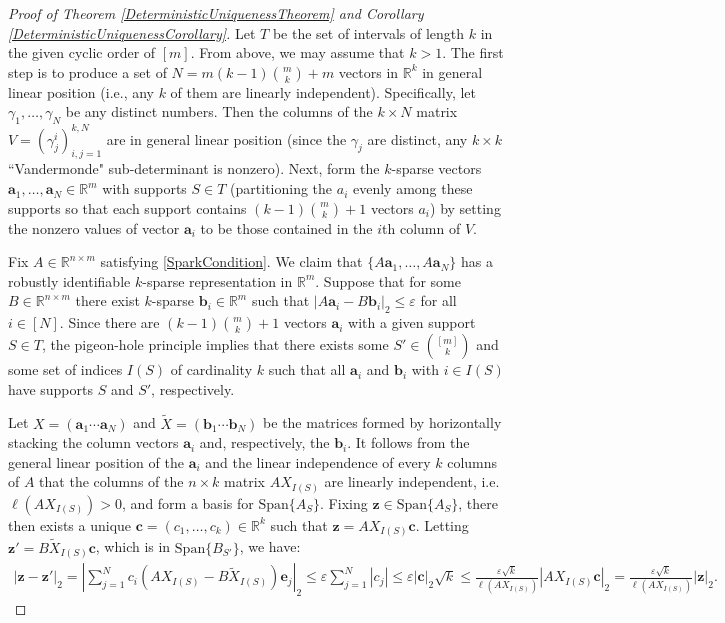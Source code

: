 \documentclass[journal, onecolumn]{IEEEtran}
\begin{document}
\begin{proof}[Proof of Theorem \ref{DeterministicUniquenessTheorem} and Corollary \ref{DeterministicUniquenessCorollary}]
Let $T$ be the set of intervals of length $k$ in the given cyclic order of $[m]$.  From above, we may assume that $k > 1$. The first step is to produce a set of $N = m(k-1){m \choose k}+m$ vectors in $\mathbb{R}^k$ in general linear position (i.e., any $k$ of them are linearly independent). Specifically, let $\gamma_1, \ldots, \gamma_N$ be any distinct numbers. Then the columns of the $k \times N$ matrix $V = (\gamma^i_j)^{k,N}_{i,j=1}$ are in general linear position (since the $\gamma_j$ are distinct, any $k \times k$ ``Vandermonde" sub-determinant is nonzero). Next, form the $k$-sparse vectors $\mathbf{a}_1, \ldots, \mathbf{a}_N \in \mathbb{R}^m$ with supports $S \in T$ (partitioning the $a_i$ evenly among these supports so that each support contains $(k-1){m \choose k}+1$ vectors $a_i$) by setting the nonzero values of vector $\mathbf{a}_i$ to be those contained in the $i$th column of $V$.

Fix $A \in \mathbb{R}^{n \times m}$ satisfying \eqref{SparkCondition}. We claim that $\{A\mathbf{a}_1, \ldots, A\mathbf{a}_N\}$ has a robustly identifiable $k$-sparse representation in $\mathbb{R}^m$. Suppose that for some $B \in \mathbb{R}^{n \times m}$ there exist $k$-sparse $\mathbf{b}_i \in \mathbb{R}^m$ such that $|A\mathbf{a}_i - B\mathbf{b}_i|_2 \leq \varepsilon$ for all $i \in [N]$. Since there are $(k-1){m \choose k}+1$ vectors $\mathbf{a}_i$ with a given support $S \in T$, the pigeon-hole principle implies that there exists some $S' \in {[m] \choose k}$ and some set of indices $I(S)$ of cardinality $k$ such that all $\mathbf{a}_i$ and $\mathbf{b}_i$ with $i \in I(S)$ have supports $S$ and $S'$, respectively.

Let $X = (\mathbf{a}_1 \cdots \mathbf{a}_N)$ and $\tilde{X} = (\mathbf{b}_1 \cdots \mathbf{b}_N)$ be the matrices formed by horizontally stacking the column vectors $\mathbf{a}_i$ and, respectively, the $\mathbf{b}_i$. It follows from the general linear position of the $\mathbf{a}_i$ and the linear independence of every $k$ columns of $A$ that the columns of the $n \times k$ matrix $AX_{I(S)}$ are linearly independent, i.e. $\ell(AX_{I(S)}) > 0$, and form a basis for $\text{Span}\{A_{S}\}$. Fixing $\mathbf{z} \in \text{Span}\{A_{S}\}$, there then exists a unique $\mathbf{c} = (c_1, \ldots, c_k) \in \mathbb{R}^k$ such that $\mathbf{z} = AX_{I(S)}\mathbf{c}$. Letting $\mathbf{z'} = B\tilde{X}_{I(S)}\mathbf{c}$, which is in $\text{Span}\{B_{S'}\}$, we have:
\begin{align*}
|\mathbf{z} - \mathbf{z'}|_2 = |\sum_{j=1}^N c_i(AX_{I(S)} - B\tilde{X}_{I(S)})\mathbf{e}_j|_2 
\leq \varepsilon \sum_{j=1}^N |c_j| 
\leq \varepsilon |\mathbf{c}|_2 \sqrt{k}  
\leq \frac{\varepsilon \sqrt{k}}{\ell(AX_{I(S)})} |AX_{I(S)}\mathbf{c}|_2
= \frac{\varepsilon \sqrt{k}}{\ell(AX_{I(S)})} |\mathbf{z}|_2.
\end{align*}


\end{proof}
\end{document}
